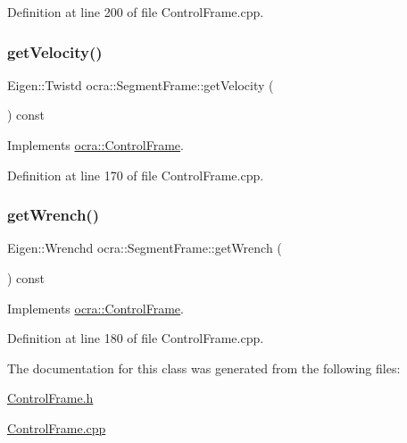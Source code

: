 Definition at line 200 of file Control\+Frame.\+cpp.

\hypertarget{classocra_1_1SegmentFrame_a6a45d4901408704ead9bbd1f5b99a666}{}\label{classocra_1_1SegmentFrame_a6a45d4901408704ead9bbd1f5b99a666} 
\subsubsection{\texorpdfstring{get\+Velocity()}{getVelocity()}}
{\footnotesize\ttfamily Eigen\+::\+Twistd ocra\+::\+Segment\+Frame\+::get\+Velocity (\begin{DoxyParamCaption}{ }\end{DoxyParamCaption}) const\hspace{0.3cm}{\ttfamily [virtual]}}



Implements \hyperlink{classocra_1_1ControlFrame_a398df839f75886867c86a8e70ac9bf24}{ocra\+::\+Control\+Frame}.



Definition at line 170 of file Control\+Frame.\+cpp.

\hypertarget{classocra_1_1SegmentFrame_a47bebcb9817083395ab034fe8fb72a19}{}\label{classocra_1_1SegmentFrame_a47bebcb9817083395ab034fe8fb72a19} 
\subsubsection{\texorpdfstring{get\+Wrench()}{getWrench()}}
{\footnotesize\ttfamily Eigen\+::\+Wrenchd ocra\+::\+Segment\+Frame\+::get\+Wrench (\begin{DoxyParamCaption}{ }\end{DoxyParamCaption}) const\hspace{0.3cm}{\ttfamily [virtual]}}



Implements \hyperlink{classocra_1_1ControlFrame_a069aaf1eab98598fbffee263fcde0c56}{ocra\+::\+Control\+Frame}.



Definition at line 180 of file Control\+Frame.\+cpp.



The documentation for this class was generated from the following files\+:\begin{DoxyCompactItemize}
\item 
\hyperlink{ControlFrame_8h}{Control\+Frame.\+h}\item 
\hyperlink{ControlFrame_8cpp}{Control\+Frame.\+cpp}\end{DoxyCompactItemize}
